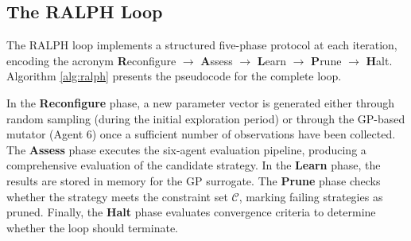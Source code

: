\documentclass[conference]{IEEEtran}
\begin{document}
\subsection{The RALPH Loop}

The RALPH loop implements a structured five-phase protocol at each iteration, encoding the acronym \textbf{R}econfigure $\to$ \textbf{A}ssess $\to$ \textbf{L}earn $\to$ \textbf{P}rune $\to$ \textbf{H}alt. Algorithm \ref{alg:ralph} presents the pseudocode for the complete loop.

In the \textbf{Reconfigure} phase, a new parameter vector is generated either through random sampling (during the initial exploration period) or through the GP-based mutator (Agent 6) once a sufficient number of observations have been collected. The \textbf{Assess} phase executes the six-agent evaluation pipeline, producing a comprehensive evaluation of the candidate strategy. In the \textbf{Learn} phase, the results are stored in memory for the GP surrogate. The \textbf{Prune} phase checks whether the strategy meets the constraint set $\mathcal{C}$, marking failing strategies as pruned. Finally, the \textbf{Halt} phase evaluates convergence criteria to determine whether the loop should terminate.
\end{document}
